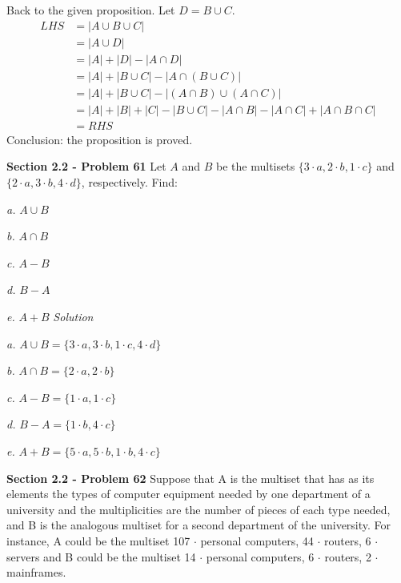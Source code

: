 \documentclass[10pt]{article}
\begin{document}
    Back to the given proposition. Let $D = B \cup C$.
    \begin{align*}
        LHS & = |A \cup B \cup C| \\
        & = |A \cup D| \\
        & = |A| + |D| - |A \cap D| \\
        & = |A| + |B \cup C| - |A \cap (B \cup C)| \\
        & = |A| + |B \cup C| - |(A \cap B) \cup (A \cap C)| \\
        & = |A| + |B| + |C| - |B \cup C| - |A \cap B| - |A \cap C| + |A \cap B \cap C| \\
        & = RHS
    \end{align*}
    Conclusion: the proposition is proved.


\clearpage
\textbf{Section 2.2 - Problem 61}
Let $A$ and $B$ be the multisets $\{3 \cdot a, 2 \cdot b, 1 \cdot c\}$ and
$\{2 \cdot a, 3 \cdot b, 4 \cdot d\}$, respectively. Find:
\par \textit{a.} $A \cup B$
\par \textit{b.} $A \cap B$
\par \textit{c.} $A - B$
\par \textit{d.} $B - A$
\par \textit{e.} $A + B$
\bigbreak
\textit{Solution} 
\bigbreak

\par \textit{a.} $A \cup B = \{3 \cdot a, 3 \cdot b, 1 \cdot c, 4 \cdot d\}$
\par \textit{b.} $A \cap B = \{2 \cdot a, 2 \cdot b\}$
\par \textit{c.} $A - B = \{1 \cdot a, 1 \cdot c\}$
\par \textit{d.} $B - A = \{1 \cdot b, 4 \cdot c\}$
\par \textit{e.} $A + B = \{5 \cdot a, 5 \cdot b, 1 \cdot b, 4 \cdot c\}$

\clearpage
\textbf{Section 2.2 - Problem 62}
Suppose that A is the multiset that has as its elements the types of computer
equipment needed by one department of a university and the multiplicities are
the number of pieces of each type needed, and B is the analogous multiset for
a second department of the university. For instance, A could be the multiset
{107 $\cdot$ personal computers, 44 $\cdot$ routers, 6 $\cdot$ servers} and B could be
the multiset {14 $\cdot$ personal computers, 6 $\cdot$ routers, 2 $\cdot$ mainframes}.
\end{document}

